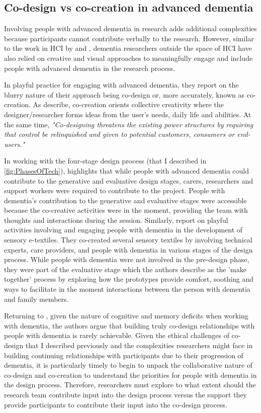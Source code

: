 \subsection{Co-design vs co-creation in advanced dementia}
Involving people with advanced dementia in research adds additional complexities because participants cannot contribute verbally to the research. However, similar to the work in HCI by \cite{lazar_using_2014} and \cite{foley_student_2020}, dementia researchers outside the space of HCI have also relied on creative and visual approaches to meaningfully engage and include people with advanced dementia in the research process.

In \cite{tsekleves2020engaging} playful practice for engaging with advanced dementia, they report on the blurry nature of their approach being co-design or, more accurately, known as co-creation. As \cite{sanders2008co} describe, co-creation orients collective creativity where the designer/researcher forms ideas from the user's needs, daily life and abilities. At the same time, \textit{"Co-designing threatens the existing power structures by requiring that control be relinquished and given to potential customers, consumers or end-users."}

In working with the four-stage design process (that I described in \ref{fig:PhasesOfTech}), \cite{tsekleves2020engaging} highlights that while people with advanced dementia could contribute to the generative and evaluative design stages, carers, researchers and support workers were required to contribute to the project. People with dementia's contribution to the generative and evaluative stages were accessible because the co-creative activities were in the moment, providing the team with thoughts and interactions during the session. Similarly, \cite{treadaway_sensor_2016} report on playful activities involving and engaging people with dementia in the development of sensory e-textiles. They co-created several sensory textiles by involving technical experts, care providers, and people with dementia in various stages of the design process. While people with dementia were not involved in the pre-design phase, they were part of the evaluative stage which the authors describe as the 'make together' process by exploring how the prototypes provide comfort, soothing and ways to facilitate in the moment interactions between the person with dementia and family members.

Returning to \cite{tsekleves2020engaging}, given the nature of cognitive and memory deficits when working with dementia, the authors argue that building truly co-design relationships with people with dementia is rarely achievable. Given the ethical challenges of co-design that I described previously and the complexities researchers might face in building continuing relationships with participants due to their progression of dementia, it is particularly timely to begin to unpack the collaborative nature of co-design and co-creation to understand the priorities for people with dementia in the design process. Therefore, researchers must explore to what extent should the research team contribute input into the design process versus the support they provide participants to contribute their input into the co-design process.

